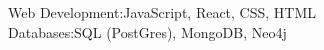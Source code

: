 \documentclass[]{resume-openfont}
\begin{document}
\begin{resumeSkillList}
    \small{\item{
    {Web Development:}{JavaScript, React, CSS, HTML}
    \\
    {Databases:}{SQL (PostGres), MongoDB, Neo4j}
    }}
\end{resumeSkillList}
\end{document}

